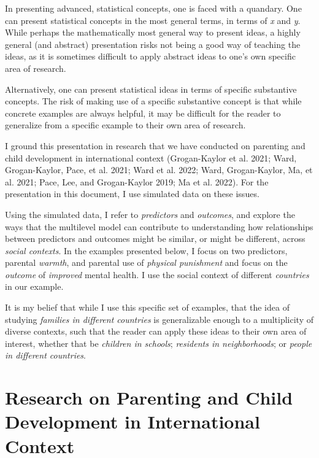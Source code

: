 \documentclass[
  letterpaper,
  DIV=11,
  numbers=noendperiod]{scrreprt}
\begin{document}
In presenting advanced, statistical concepts, one is faced with a
quandary. One can present statistical concepts in the most general
terms, in terms of \emph{x} and \emph{y}. While perhaps the
mathematically most general way to present ideas, a highly general (and
abstract) presentation risks not being a good way of teaching the ideas,
as it is sometimes difficult to apply abstract ideas to one's own
specific area of research.

Alternatively, one can present statistical ideas in terms of specific
substantive concepts. The risk of making use of a specific substantive
concept is that while concrete examples are always helpful, it may be
difficult for the reader to generalize from a specific example to their
own area of research.

I ground this presentation in research that we have conducted on
parenting and child development in international context (Grogan-Kaylor
et al. 2021; Ward, Grogan-Kaylor, Pace, et al. 2021; Ward et al. 2022;
Ward, Grogan-Kaylor, Ma, et al. 2021; Pace, Lee, and Grogan-Kaylor 2019;
Ma et al. 2022). For the presentation in this document, I use simulated
data on these issues.

Using the simulated data, I refer to \emph{predictors} and
\emph{outcomes}, and explore the ways that the multilevel model can
contribute to understanding how relationships between predictors and
outcomes might be similar, or might be different, across \emph{social
contexts}. In the examples presented below, I focus on two predictors,
parental \emph{warmth}, and parental use of \emph{physical punishment}
and focus on the \emph{outcome} of \emph{improved} mental health. I use
the social context of different \emph{countries} in our example.

It is my belief that while I use this specific set of examples, that the
idea of studying \emph{families in different countries} is generalizable
enough to a multiplicity of diverse contexts, such that the reader can
apply these ideas to their own area of interest, whether that be
\emph{children in schools}; \emph{residents in neighborhoods}; or
\emph{people in different countries}.

\hypertarget{research-on-parenting-and-child-development-in-international-context}{%
\section{Research on Parenting and Child Development in International
Context}\label{research-on-parenting-and-child-development-in-international-context}}
\end{document}
